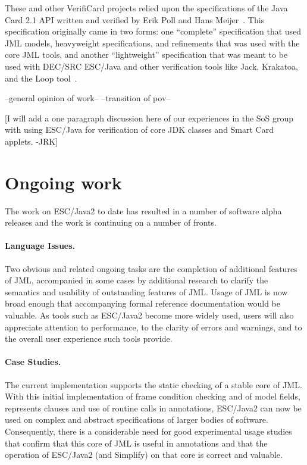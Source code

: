 \documentclass{acm_proc_article-sp}
\begin{document}
These and other VerifiCard projects relied upon the specifications of
the Java Card 2.1 API written and verified by Erik Poll and Hans
Meijer~\cite{MeijerPoll01}.  This specification originally came in two
forms: one ``complete'' specification that used JML models,
heavyweight specifications, and refinements that was used with the
core JML tools, and another ``lightweight'' specification that was
meant to be used with DEC/SRC ESC/Java and other verification tools
like Jack, Krakatoa, and the Loop tool~\cite{a,b,c}.



--general opinion of work--
--transition of pov--

[I will add a one paragraph discussion here of our experiences in
the SoS group with using ESC/Java for verification of core JDK classes
and Smart Card applets. -JRK]

\section{Ongoing work}
The work on ESC/Java2 to date has resulted in a number of software
alpha releases and the work is continuing on a number of fronts.

\paragraph*{Language Issues.} Two obvious and related ongoing tasks are
the completion of additional features of JML, accompanied in some
cases by additional research to clarify the semantics and usability of
outstanding features of JML.  Usage of JML is now broad enough that
accompanying formal reference documentation would be valuable.  As
tools such as ESC/Java2 become more widely used, users will also
appreciate attention to performance, to the clarity of errors and
warnings, and to the overall user experience such tools provide.

\paragraph*{Case Studies.} The current implementation supports the
static checking of a stable core of JML.  With this initial
implementation of frame condition checking and of model fields,
represents clauses and use of routine calls in annotations, ESC/Java2
can now be used on complex and abstract specifications of larger
bodies of software.  Consequently, there is a considerable need for
good experimental usage studies that confirm that this core of JML is
useful in annotations and that the operation of ESC/Java2 (and
Simplify) on that core is correct and valuable.
\end{document}
